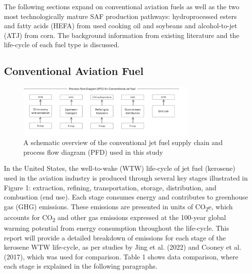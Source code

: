 \documentclass[12pt]{article}
\begin{document}
The following sections expand on conventional aviation fuels as well as the two most technologically mature SAF production pathways: hydroprocessed esters and fatty acids (HEFA) from used cooking oil and soybeans and alcohol-to-jet (ATJ) from corn. The background information from existing literature and the life-cycle of each fuel type is discussed.


\subsection{Conventional Aviation Fuel }

\begin{figure}[H]
\centering
\includegraphics[width=0.8\textwidth]{Fig 1.png} %
\caption{A schematic overview of the conventional jet fuel supply chain and process flow diagram (PFD) used in this study}
\label{fig:figure 1}
\end{figure}

In the United States, the well-to-wake (WTW) life-cycle of jet fuel (kerosene) used in the aviation industry is produced through several key stages illustrated in Figure 1: extraction, refining, transportation, storage, distribution, and combustion (end use). Each stage consumes energy and contributes to greenhouse gas (GHG) emissions. These emissions are presented in units of CO\textsubscript{2}e, which accounts for CO\textsubscript{2} and other gas emissions expressed at the 100-year global warming potential from energy consumption throughout the life-cycle. This report will provide a detailed breakdown of emissions for each stage of the kerosene WTW life-cycle, as per studies by Jing et al. (2022) and Cooney et al. (2017), which was used for comparison. Table 1 shows data comparison, where each stage is explained in the following paragraphs.
\end{document}
